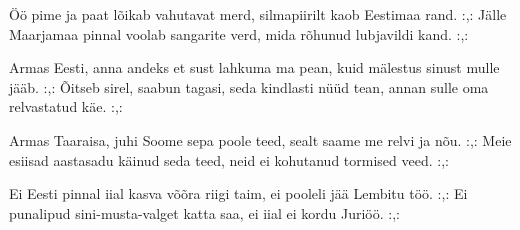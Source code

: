 \"O\"o pime ja paat l\~oikab vahutavat merd,
silmapiirilt kaob Eestimaa rand.
:,: J\"alle Maarjamaa pinnal voolab sangarite verd,
mida r\~ohunud lubjavildi kand. :,:

Armas Eesti, anna andeks et sust lahkuma ma pean,
kuid m\"alestus sinust mulle j\"a\"ab.
:,: \~Oitseb sirel, saabun tagasi, seda kindlasti n\"u\"ud tean,
annan sulle oma relvastatud k\"ae. :,:

Armas Taaraisa, juhi Soome sepa poole teed,
sealt saame me relvi ja n\~ou.
:,: Meie esiisad aastasadu k\"ainud seda teed,
neid ei kohutanud tormised veed. :,:

Ei Eesti pinnal iial kasva v\~o\~ora riigi taim,
ei pooleli j\"a\"a Lembitu t\"o\"o.
:,: Ei punalipud sini-musta-valget katta saa,
ei iial ei kordu Juri\"o\"o. :,: